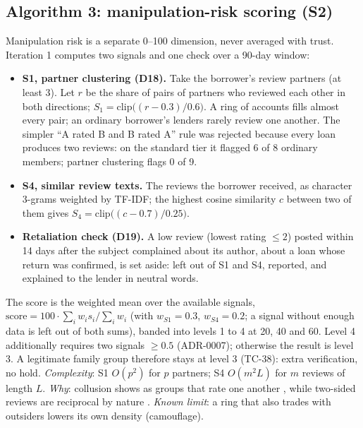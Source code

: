 \subsection{Algorithm 3: manipulation-risk scoring (S2)}\label{sec:algorithm-3-manipulation-risk-scoring}
Manipulation risk is a separate 0--100 dimension, never averaged with trust. Iteration 1 computes two signals and one check over a 90-day window:

\begin{itemize}
\item \textbf{S1, partner clustering (D18).} Take the borrower's review partners (at least 3). Let $r$ be the share of pairs of partners who reviewed each other in both directions; $S_1 = \mathrm{clip}\bigl((r - 0.3)/0.6\bigr)$. A ring of accounts fills almost every pair; an ordinary borrower's lenders rarely review one another. The simpler ``A rated B and B rated A'' rule was rejected because every loan produces two reviews: on the standard tier it flagged 6 of 8 ordinary members; partner clustering flags 0 of 9.
\item \textbf{S4, similar review texts.} The reviews the borrower received, as character 3-grams weighted by TF-IDF; the highest cosine similarity $c$ between two of them gives $S_4 = \mathrm{clip}\bigl((c - 0.7)/0.25\bigr)$.
\item \textbf{Retaliation check (D19).} A low review (lowest rating $\leq 2$) posted within 14 days after the subject complained about its author, about a loan whose return was confirmed, is set aside: left out of S1 and S4, reported, and explained to the lender in neutral words.
\end{itemize}

The score is the weighted mean over the available signals, $\text{score} = 100 \cdot \sum_i w_i s_i \big/ \sum_i w_i$ (with $w_{S1} = 0.3$, $w_{S4} = 0.2$; a signal without enough data is left out of both sums), banded into levels 1 to 4 at 20, 40 and 60. Level 4 additionally requires two signals $\geq 0.5$ (ADR-0007); otherwise the result is level 3. A legitimate family group therefore stays at level 3 (TC-38): extra verification, no hold. \textit{Complexity}: S1 $O(p^2)$ for $p$ partners; S4 $O(m^2 L)$ for $m$ reviews of length $L$. \textit{Why}: collusion shows as groups that rate one another \cite{mukherjee2012,hooi2016}, while two-sided reviews are reciprocal by nature \cite{bolton2013,fradkin2021}. \textit{Known limit}: a ring that also trades with outsiders lowers its own density (camouflage).

